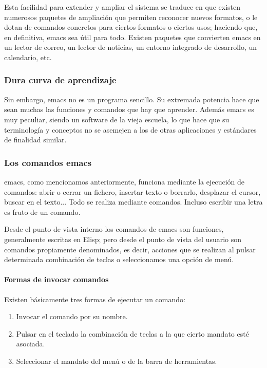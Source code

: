 \documentclass[a4paper, 11pt, titlepage]{article}
\begin{document}
    Esta facilidad para extender y ampliar el sistema se traduce en que existen numerosos 
    paquetes de ampliación que permiten reconocer nuevos formatos, o le dotan de comandos 
    concretos para ciertos formatos o ciertos usos; haciendo que, en definitiva, emacs 
    sea útil para todo. Existen paquetes que convierten emacs en un lector de correo, 
    un lector de noticias, un entorno integrado de desarrollo, un calendario, etc.

    \subsubsection{Dura curva de aprendizaje} Sin embargo, emacs no es un programa sencillo.
    Su extremada potencia hace que sean muchas las funciones y comandos que hay que aprender.
    Además emacs es muy peculiar, siendo un software de la vieja escuela, lo que hace que 
    su terminología y conceptos no se asemejen a los de otras aplicaciones y estándares de 
    finalidad similar.

    \subsubsection{Los comandos emacs} emacs, como mencionamos anteriormente, 
    funciona mediante la ejecución de comandos: abrir o cerrar un fichero, insertar 
    texto o borrarlo, desplazar el cursor, buscar en el texto... Todo se realiza 
    mediante comandos. Incluso escribir una letra es fruto de un comando.

    Desde el punto de vista interno los comandos de emacs son funciones, generalmente 
    escritas en Elisp; pero desde el punto de vista del usuario son comandos propiamente 
    denominados, es decir, acciones que se realizan al pulsar determinada combinación de 
    teclas o seleccionamos una opción de menú.

    \paragraph{Formas de invocar comandos} Existen básicamente tres formas de ejecutar 
    un comando:
    
    \begin{enumerate}
        \item Invocar el comando por su nombre.
        \item Pulsar en el teclado la combinación de teclas a la que cierto mandato esté 
        asociada.
        \item Seleccionar el mandato del menú o de la barra de herramientas.
    \end{enumerate}
\end{document}
